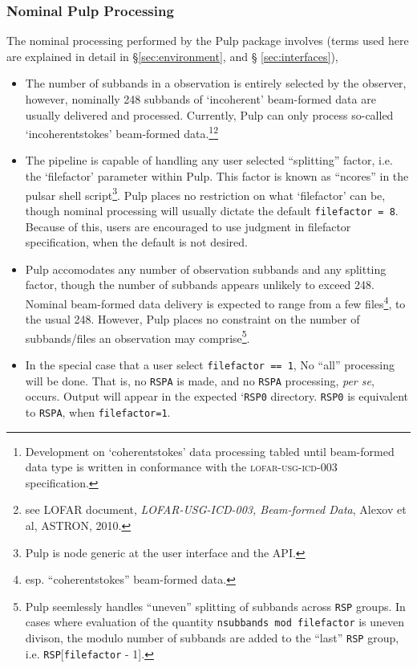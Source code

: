 \documentclass[a4paper,10pt,bibtotoc]{scrartcl}
\begin{document}
\subsubsection{Nominal Pulp Processing}
The nominal processing performed by the Pulp package involves (terms
used here are explained in detail in \S \ref{sec:environment}, and \S
\ref{sec:interfaces}),
\begin{itemize}
\item The number of subbands in a observation is entirely selected by the observer,
however, nominally 248 subbands of `incoherent' beam-formed data are
usually delivered and processed.  Currently, Pulp can only process
so-called  `incoherentstokes' beam-formed data.\footnote{Development
  on `coherentstokes' data processing tabled until beam-formed data
  type is written in conformance with the \textsc{lofar-usg-icd-003}
  specification.}\footnote{see LOFAR document,
  \textit{LOFAR-USG-ICD-003, Beam-formed Data}, Alexov et al, ASTRON,
  2010.}  
\item The pipeline is capable of handling any user selected ``splitting'' factor, i.e. the 
`filefactor' parameter within Pulp.  This factor is known as ``ncores'' in the pulsar
shell script\footnote{Pulp is node generic at the user interface and the API.}.
Pulp places no restriction on what `filefactor' can be, though nominal
processing will usually dictate the default \verb|filefactor = 8|.
Because of this, users are encouraged to use judgment in filefactor
specification, when the default is not desired.
\item Pulp accomodates any number of observation subbands and any
  splitting factor, though the number of subbands appears unlikely to
  exceed 248.  Nominal beam-formed data delivery is expected to range
  from a few files\footnote{esp. ``coherentstokes'' beam-formed data.}, to the usual
  248.  However, Pulp places no constraint on the number of subbands/files an
  observation may comprise\footnote{ Pulp seemlessly handles ``uneven'' splitting of subbands across \texttt{RSP} groups. In cases where evaluation of the quantity \texttt{nsubbands mod filefactor} is uneven divison, the modulo number of subbands are added to the ``last'' \texttt{RSP} group, i.e.  \texttt{RSP}[\texttt{filefactor} - 1].}.
\item In the special case that a user select \verb|filefactor == 1|,
  No ``all'' processing will be done.  That is, no
  \verb|RSPA| is made, and no \verb|RSPA| processing, \emph{per se},
  occurs.  Output will appear in the expected `\verb|RSP0| directory. \verb|RSP0| is equivalent to  \verb|RSPA|, when \verb|filefactor=1|.

\end{itemize}
\end{document}
